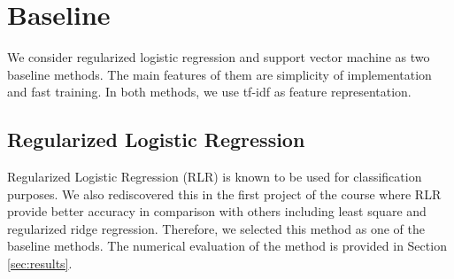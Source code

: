 \documentclass[8pt,conference,compsocconf]{IEEEtran}
\begin{document}
\section{Baseline} \label{sec:baseline}

We consider regularized logistic regression and support vector machine as two baseline methods. The main features of them are simplicity of implementation and fast training. In both methods, we use tf-idf as feature representation.

\subsection{Regularized Logistic Regression}
Regularized Logistic Regression (RLR) is known to be used for classification purposes. We also rediscovered this in the first project of the course where RLR provide better accuracy in comparison with others including least square and regularized ridge regression. Therefore, we selected this method as one of the baseline methods. The numerical evaluation of the method is provided in Section \ref{sec:results}.
\end{document}
